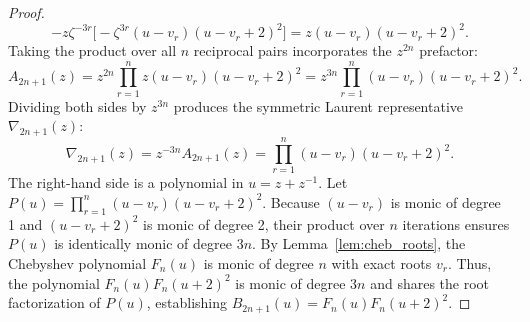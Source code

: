\documentclass[10pt,a4paper]{amsart}
\begin{document}
\begin{proof}
\begin{equation*}
-z\zeta^{-3r} \Big[ -\zeta^{3r} (u - v_r)(u - v_r + 2)^2 \Big] = z(u - v_r)(u - v_r + 2)^2.
\end{equation*}
Taking the product over all $n$ reciprocal pairs incorporates the $z^{2n}$ prefactor:
\begin{equation*}
A_{2n+1}(z) = z^{2n} \prod_{r=1}^n z(u - v_r)(u - v_r + 2)^2 = z^{3n} \prod_{r=1}^n (u - v_r)(u - v_r + 2)^2.
\end{equation*}
Dividing both sides by $z^{3n}$ produces the symmetric Laurent representative $\nabla_{2n+1}(z)$:
\begin{equation*}
\nabla_{2n+1}(z) = z^{-3n} A_{2n+1}(z) = \prod_{r=1}^n (u - v_r)(u - v_r + 2)^2.
\end{equation*}
The right-hand side is a polynomial in $u = z+z^{-1}$. Let $P(u) = \prod_{r=1}^n (u - v_r)(u - v_r + 2)^2$. Because $(u - v_r)$ is monic of degree 1 and $(u - v_r + 2)^2$ is monic of degree 2, their product over $n$ iterations ensures $P(u)$ is identically monic of degree $3n$. By Lemma~\ref{lem:cheb_roots}, the Chebyshev polynomial $F_n(u)$ is monic of degree $n$ with exact roots $v_r$. Thus, the polynomial $F_n(u)F_n(u+2)^2$ is monic of degree $3n$ and shares the root factorization of $P(u)$, establishing $B_{2n+1}(u) = F_n(u)F_n(u+2)^2$.
\end{proof}
\end{document}
